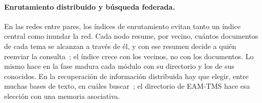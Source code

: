 \paragraph{Enrutamiento distribuido y búsqueda federada.}
En las redes entre pares, los índices de enrutamiento evitan tanto un índice central
como inundar la red.
Cada nodo resume, por vecino, cuántos documentos de cada tema se alcanzan a través de él,
y con ese resumen decide a quién reenviar la consulta~\cite{crespo2002routing}; el índice
crece con los vecinos, no con los documentos.
Lo mismo hace en la fase madura cada módulo con su directorio y los de sus conocidos.
En la recuperación de información distribuida hay que elegir, entre muchas bases de
texto, en cuáles buscar~\cite{callan2000distributed}; el directorio de EAM-TMS hace esa
elección con una memoria asociativa.
